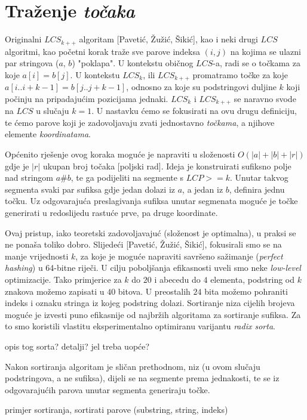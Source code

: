 \documentclass[times, utf8, seminar, numeric]{fer}
\begin{document}
\section{Traženje \emph{točaka}}
Originalni $LCS_{k++}$ algoritam [Pavetić, Žužić, Šikić], kao i neki
drugi $LCS$ algoritmi, kao početni korak traže sve parove indeksa $(i,
j)$ na kojima se ulazni par stringova ($a$, $b$) "poklapa". U
kontekstu običnog $LCS$-a, radi se o točkama za koje $a[i] = b[j]$.  U
kontekstu $LCS_k$, ili $LCS_{k++}$ promatramo točke za koje $a[i..i+k-1] =
b[j..j+k-1]$, odnosno za koje su podstringovi duljine $k$ koji počinju
na pripadajućim pozicijama jednaki. $LCS_k$ i $LCS_{k++}$ se naravno svode
na $LCS$ u slučaju $k = 1$. U nastavku ćemo se fokusirati na ovu drugu
definiciju, te ćemo parove koji je zadovoljavaju zvati jednostavno
\emph{točkama}, a njihove elemente \emph{koordinatama}.

Općenito rješenje ovog koraka moguće je napraviti u složenosti
$O(|a| + |b| + |r|)$ gdje je $|r|$ ukupan broj točaka [poljski rad].
Ideja je konstruirati sufiksno polje nad stringom $a\#b$, te ga
podijeliti na segmente s $LCP >= k$. Unutar takvog segmenta svaki
par sufiksa gdje jedan dolazi iz $a$, a jedan iz $b$, definira jednu
točku. Uz odgovarajuća preslagivanja sufiksa unutar segmenata moguće
je točke generirati u redoslijedu rastuće prve, pa druge koordinate.

Ovaj pristup, iako teoretski zadovoljavajuć (složenost je
optimalna), u praksi se ne ponaša toliko dobro. Slijedeći [Pavetić,
  Žužić, Šikić], fokusirali smo se na manje vrijednosti $k$, za koje
je moguće napraviti savršeno sažimanje (\emph{perfect hashing}) u
64-bitne riječi. U cilju poboljšanja efikasnosti uveli smo neke
\emph{low-level} optimizacije. Tako primjerice za $k$ do $20$ i abecedu
do $4$ elementa, podstring od $k$ znakova možemo zapisati u $40$
bitova.  U preostalih $24$ bita možemo pohraniti indeks i oznaku
stringa iz kojeg podstring dolazi. Sortiranje niza cijelih brojeva
moguće je izvesti puno efikasnije od najbržih algoritama za
sortiranje sufiksa. Za to smo koristili vlastitu eksperimentalno 
optimiranu varijantu \emph{radix sorta}.

{opis tog sorta? detalji? jel treba uopće?}

Nakon sortiranja algoritam je sličan prethodnom, niz (u ovom slučaju
podstringova, a ne sufiksa), dijeli se na segmente prema jednakosti,
te se iz odgovarajućih parova unutar segmenta generiraju točke.

{primjer sortiranja, sortirati parove (substring, string, indeks)}
\end{document}
